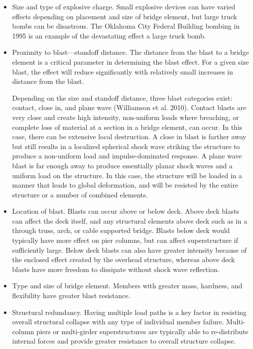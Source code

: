 \begin{itemize}
  \item Size and type of explosive charge. Small explosive devices can have varied effects depending on placement
  and size of bridge element, but large truck bombs can be disastrous. The Oklahoma City Federal Building
  bombing in 1995 is an example of the devastating effect a large truck bomb.
  \item Proximity to blast—standoff distance. The distance from the blast to a bridge element is a critical parameter
  in determining the blast effect. For a given size blast, the effect will reduce significantly with relatively
  small increases in distance from the blast.

  Depending on the size and standoff distance, three blast categories exist: contact, close in, and plane wave
(Williamson et al. 2010). Contact blasts are very close and create high intensity, non-uniform loads where
breaching, or complete loss of material at a section in a bridge element, can occur. In this case, there can be extensive local destruction. A close in blast is farther away but still results in a localized spherical shock
wave striking the structure to produce a non-uniform load and impulse-dominated response. A plane wave
blast is far enough away to produce essentially planar shock waves and a uniform load on the structure. In
this case, the structure will be loaded in a manner that leads to global deformation, and will be resisted by the
entire structure or a number of combined elements.

\item Location of blast. Blasts can occur above or below deck. Above deck blasts can affect the deck itself, and
any structural elements above deck such as in a through truss, arch, or cable supported bridge. Blasts below
deck would typically have more effect on pier columns, but can affect superstructure if sufficiently large.
Below deck blasts can also have greater intensity because of the enclosed effect created by the overhead
structure, whereas above deck blasts have more freedom to dissipate without shock wave reflection.

\item Type and size of bridge element. Members with greater mass, hardness, and flexibility have greater blast resistance.
\item Structural redundancy. Having multiple load paths is a key factor in resisting overall structural collapse with any type of individual member failure. Multi-column piers or multi-girder superstructures are typically able to re-distribute internal forces and provide greater resistance to overall structure collapse.
\end{itemize}

